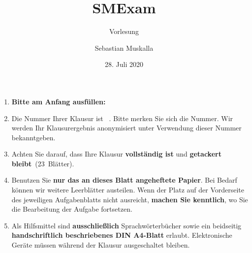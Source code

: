 \documentclass
[
    lang=de,
    folder=../style,
    a4paper,
    12pt,
    parskip=half-,
    numbers=enddot,
    fleqn,
]{../style/smexam}
\title{SMExam}
\subtitle{Vorlesung}
\author{Sebastian Muskalla}
\date{28. Juli 2020}
\begin{document}
    \begin{exam}


    \maketitle


    {\small
    \begin{enumerate}
        \item \textbf{Bitte am Anfang ausfüllen:}
        \item
            Die Nummer Ihrer Klausur ist
            \quad
            \monobf{\# \currentnumber}\ .
            \quad
            Bitte merken Sie sich die Nummer.
            Wir werden Ihr Klausurergebnis anonymisiert unter Verwendung dieser Nummer bekanntgeben.
        \item
            Achten Sie darauf, dass Ihre Klausur \textbf{vollständig ist} und \textbf{getackert bleibt}~(23~Blätter).
        \item
            Benutzen Sie \textbf{nur das an dieses Blatt angeheftete Papier}.
            Bei Bedarf können wir weitere Leerblätter austeilen.
            Wenn der Platz auf der Vorderseite des jeweiligen Aufgabenblatts nicht ausreicht, \textbf{machen Sie kenntlich}, wo Sie die Bearbeitung der Aufgabe fortsetzen.
        \item
            Als Hilfsmittel sind \textbf{ausschließlich} Sprachwörterbücher sowie ein beidseitig \textbf{handschriftlich beschriebenes DIN A4-Blatt} erlaubt.
            Elektronische Geräte müssen während der Klausur ausgeschaltet bleiben.

\end{enumerate}}
\end{exam}
\end{document}
